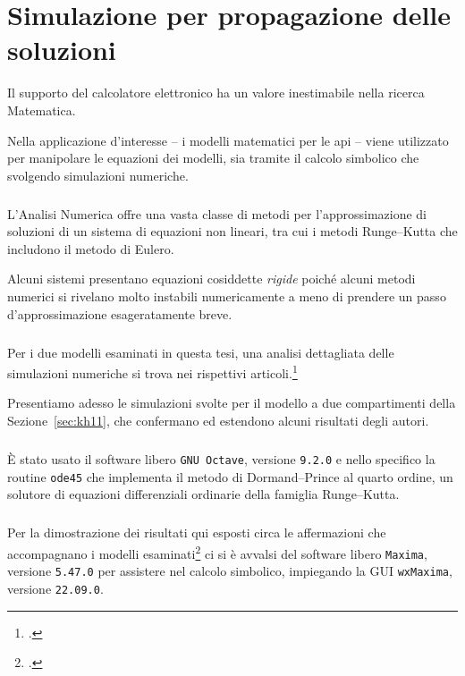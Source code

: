 \chapter{Simulazione per propagazione delle soluzioni}
Il supporto del calcolatore elettronico ha un valore inestimabile nella ricerca Matematica.

Nella applicazione d'interesse -- i modelli matematici per le api -- viene utilizzato
per manipolare le equazioni dei modelli, sia tramite il calcolo simbolico che svolgendo simulazioni numeriche.

\paragraph{}
L'Analisi Numerica offre una vasta classe di metodi per l'approssimazione di soluzioni di un sistema di equazioni
non lineari, tra cui i metodi Runge--Kutta che includono il metodo di Eulero.

Alcuni sistemi presentano equazioni cosiddette \emph{rigide} poiché alcuni metodi numerici si rivelano
molto instabili numericamente a meno di prendere un passo d'approssimazione esageratamente breve.

\paragraph{}
Per i due modelli esaminati in questa tesi, una analisi dettagliata delle simulazioni numeriche
si trova nei rispettivi articoli.\footcite{khoury2011,ratti2017}

Presentiamo adesso le simulazioni svolte per il modello a due compartimenti della Sezione~\ref{sec:kh11},
che confermano ed estendono alcuni risultati degli autori.

\paragraph{}
È stato usato il software libero \texttt{GNU Octave}, versione \texttt{9.2.0} e nello specifico
la routine \texttt{ode45} che implementa il metodo di Dormand--Prince al quarto ordine, un solutore
di equazioni differenziali ordinarie della famiglia Runge--Kutta.

\paragraph{}
Per la dimostrazione dei risultati qui esposti circa le affermazioni che accompagnano i modelli
esaminati\footcite{khoury2011,ratti2017} ci si è avvalsi del software libero \texttt{Maxima},
versione \texttt{5.47.0} per assistere nel calcolo simbolico,
impiegando la GUI \texttt{wxMaxima}, versione \texttt{22.09.0}.




